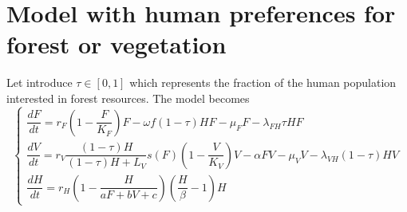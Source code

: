 \documentclass{article}
\begin{document}
\newpage

\section{Model with human preferences for forest or vegetation}
Let introduce $\tau \in [0,1]$ which represents the fraction of the human population interested in forest resources. The model becomes
\begin{equation}    
\left\{ \begin{array}{l}
\dfrac{dF}{dt}=r_{F}\left(1-\dfrac{F}{K_{F}}\right)F-\omega f (1-\tau) H F - \mu_F F -\lambda_{FH} \tau H F  \\
\dfrac{dV}{dt}=r_V \dfrac{(1-\tau)H}{(1-\tau)H + L_V} s(F) \left(1-\dfrac{V}{K_{V}}\right)V -\alpha FV-\mu_V V -\lambda_{VH} (1-\tau) H V\\
\dfrac{dH}{dt}=r_H \left(1-\dfrac{H}{aF + bV + c} \right) (\dfrac{H}{\beta} - 1) H
\end{array}\right.
\label{modelPreferences}
\end{equation}

\newpage
\end{document}
